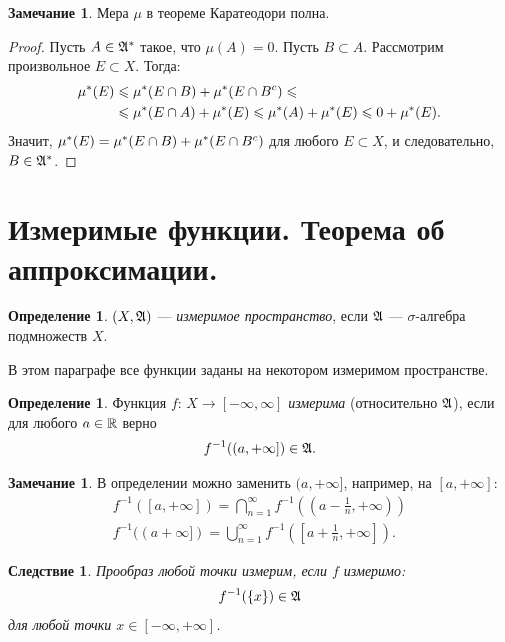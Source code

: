 \documentclass[a4paper,14pt]{extarticle}
\newcounter{theoremCnt}
\theoremstyle{definition}
\newtheorem{df}[theoremCnt]{Определение}
\theoremstyle{plain}
\theoremstyle{plain}
\theoremstyle{plain}
\newtheorem{crly}[theoremCnt]{Следствие}
\theoremstyle{plain}
\theoremstyle{definition}
\theoremstyle{definition}
\newtheorem{remrk}[theoremCnt]{Замечание}
\theoremstyle{definition}
\theoremstyle{definition}
\theoremstyle{definition}
\theoremstyle{definition}
\theoremstyle{plain}
\theoremstyle{plain}
\theoremstyle{plain}
\theoremstyle{plain}
\theoremstyle{definition}
\theoremstyle{definition}
\theoremstyle{definition}
\theoremstyle{definition}
\theoremstyle{definition}
\newcommand{\R}{\ensuremath \mathbb{R}}
\newcommand{\A}{\ensuremath \mathfrak{A}}
\newcommand{\mua}{\ensuremath \mu^\ast}
\begin{document}
\begin{remrk}
 Мера $\mu$ в теореме Каратеодори полна.
\end{remrk}
\begin{proof}
 Пусть $A \in \A^{\ast}$ такое, что $\mu(A) = 0$. Пусть  $B \subset A$. Рассмотрим произвольное $E \subset X$. Тогда:
 \begin{align*}
  \mua(E) & \leqslant \mua(E \cap B) + \mua(E \cap B^{c}) \leqslant \\
  & \leqslant \mua(E \cap A) + \mua(E) \leqslant \mua(A) + \mua(E) \leqslant 0 + \mua(E)
 .\end{align*} Значит, $\mua(E) = \mua(E \cap B) + \mua(E \cap B^{c})$ для любого $E \subset X$, и следовательно, $B \in \A^{\ast}$.
\end{proof}
\section{Измеримые функции. Теорема об аппроксимации.}
\begin{df}
 $(X, \A)$ --- \textit{измеримое пространство}, если  $\A$ ---  $\sigma$-алгебра подмножеств $X$.
\end{df}
В этом параграфе все функции заданы на некотором измеримом пространстве.
\begin{df}
 Функция $f \colon\, X \to [-\infty, \infty] $ \textit{измерима} (относительно $\A$), если для любого $a \in \R$ верно
 \begin{align*}
  f^{-1}((a, +\infty]) \in \A
 .\end{align*}
\end{df}
\begin{remrk}
 В определении можно заменить $(a, +\infty]$, например, на  $[a, +\infty]$:
 \begin{align*}
  f^{-1}([a, +\infty]) = \bigcap_{n=1}^{\infty} f^{-1}\left(\left(a - \frac{1}{n}, +\infty \right)\right) \\
  f^{-1}((a +\infty]) = \bigcup_{n=1}^{\infty}  f^{-1} \left( [a + \frac{1}{n}, +\infty] \right)
 .\end{align*}
\end{remrk}
\begin{crly}
 Прообраз любой точки измерим, если $f$ измеримо:
 \begin{align*}
  f^{-1}(\left\{ x \right\}) \in \A
 \end{align*} для любой точки $x \in [-\infty, +\infty]$.
\end{crly}
\end{document}
